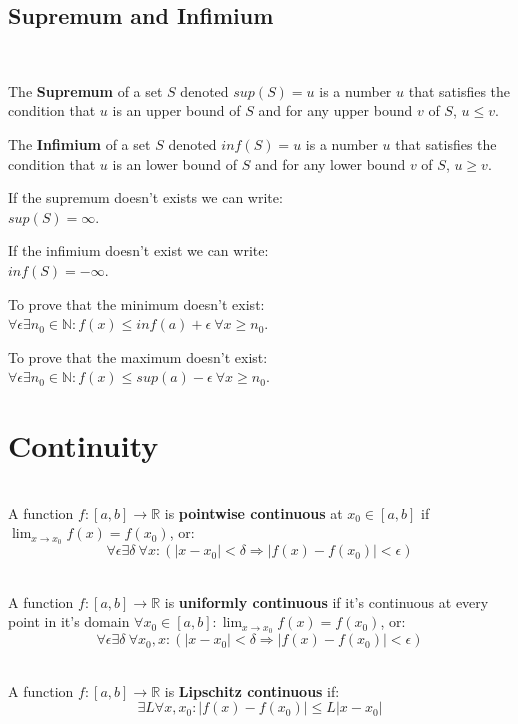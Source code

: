 \documentclass[8pt,a4paper]{extarticle}     %
\theoremstyle{definition}
\theoremstyle{definition}
\theoremstyle{definition}
\newcommand{\R}{\mathbb{R}}
\newcommand{\N}{\mathbb{N}}
\begin{document}
\begin{multicols}{4}
\subsection{Supremum and Infimium}
\begin{boxdefinition}
	\
	\begin{bulletlist}
		\item The \textbf{Supremum} of a set $S$ denoted $sup(S) = u$ is a number $u$ that satisfies the condition that $u$ is an upper bound of $S$ and for any upper bound $v$ of $S$, $u\leq v$.
		\item The \textbf{Infimium} of a set $S$ denoted $inf(S) = u$ is a number $u$ that satisfies the condition that $u$ is an lower bound of $S$ and for any lower bound $v$ of $S$, $u\geq v$.
	\end{bulletlist}
\end{boxdefinition}
\begin{bulletlist}
	\item If the supremum doesn't exists we can write:\\ $sup(S) = \infty$.
	\item If the infimium doesn't exist we can write:\\ $inf(S) = -\infty$.
	\item To prove that the minimum doesn't exist: \\ $\forall \epsilon \exists n_0 \in \N: f(x) \leq inf(a) + \epsilon \  \forall x \geq n_0$.
	\item To prove that the maximum doesn't exist: \\ $\forall \epsilon \exists n_0 \in \N: f(x) \leq sup(a) - \epsilon \  \forall x \geq n_0$.
\end{bulletlist}

\vfill\null
\columnbreak
\section{Continuity}
\begin{boxdefinition} \ \\
	A function $f:[a,b]\rightarrow\R$ is \textbf{pointwise continuous} at $x_0\in[a,b]$ if $\lim_{x\to x_0}f(x) = f(x_0)$, or:
	$$\forall \epsilon \exists \delta \ \forall x : (|x-x_0| < \delta \Rightarrow |f(x)-f(x_0)| < \epsilon)$$
\end{boxdefinition}
\begin{boxdefinition} \ \\
	A function $f:[a,b]\rightarrow \R$ is \textbf{uniformly continuous} if it's continuous at every point in it's domain $\forall x_0 \in [a,b]: \lim_{x\to x_0}f(x) = f(x_0)$, or:
	$$\forall\epsilon\exists\delta \ \forall x_0, x: (|x-x_0| < \delta \Rightarrow |f(x)-f(x_0)| < \epsilon)$$
\end{boxdefinition}
\begin{boxdefinition} \ \\
	A function $f:[a,b]\rightarrow \R$ is \textbf{Lipschitz continuous} if:
	$$\exists L \forall x, x_0: |f(x)-f(x_0)| \leq L|x-x_0|$$
\end{boxdefinition}

\end{multicols}
\end{document}
